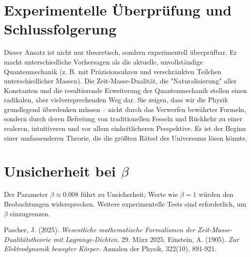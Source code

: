 \documentclass{article}
\begin{document}
	\section{Experimentelle Überprüfung und Schlussfolgerung}
	Dieser Ansatz ist nicht nur theoretisch, sondern experimentell überprüfbar. Er macht unterschiedliche Vorhersagen als die aktuelle, unvollständige Quantenmechanik (z. B. mit Präzisionsuhren und verschränkten Teilchen unterschiedlicher Massen). Die Zeit-Masse-Dualität, die "Naturalisierung" aller Konstanten und die resultierende Erweiterung der Quantenmechanik stellen einen radikalen, aber vielversprechenden Weg dar. Sie zeigen, dass wir die Physik grundlegend überdenken müssen – nicht durch das Verwerfen bewährter Formeln, sondern durch deren Befreiung von traditionellen Fesseln und Rückkehr zu einer realeren, intuitiveren und vor allem einheitlicheren Perspektive. Es ist der Beginn einer umfassenderen Theorie, die die größten Rätsel des Universums lösen könnte.
	
	\section{Unsicherheit bei \(\beta\)}
	Der Parameter \( \beta \approx 0.008 \) führt zu Unsicherheit; Werte wie \( \beta = 1 \) würden den Beobachtungen widersprechen. Weitere experimentelle Tests sind erforderlich, um \( \beta \) einzugrenzen.
	
	\begin{thebibliography}{9}
		 Pascher, J. (2025). \textit{Wesentliche mathematische Formalismen der Zeit-Masse-Dualitätstheorie mit Lagrange-Dichten}. 29. März 2025.
		 Einstein, A. (1905). \textit{Zur Elektrodynamik bewegter Körper}. Annalen der Physik, 322(10), 891-921.
	\end{thebibliography}
	
\end{document}
